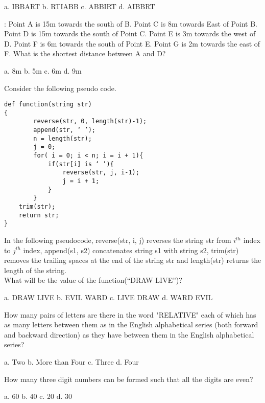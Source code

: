 \documentclass[a4paper, addpoints]{exam}
\begin{document}
\begin{questions}
	\begin{oneparcheckboxes}
		\choice a. IBBART
		\choice b. RTIABB
		\choice c. ABBIRT
		\choice d. AIBBRT
	\end{oneparcheckboxes}
	: Point A is 15m towards the south of B. Point C is 8m towards East of Point B. Point D is 15m towards the south of Point C. Point E is 3m towards the west of D. Point F is 6m towards the south of Point E. Point G is 2m towards the east of F. What is the shortest distance between A and D?\\
	
	\begin{oneparcheckboxes}
		\choice a. 8m
		\choice b. 5m
		\choice c. 6m
		\choice d. 9m
	\end{oneparcheckboxes}
	\question Consider the following pseudo code.
	\begin{verbatim}
def function(string str)
{
		reverse(str, 0, length(str)-1);
		append(str, ‘ ’);
		n = length(str);
		j = 0;
		for( i = 0; i < n; i = i + 1){
			if(str[i] is ‘ ’){
				reverse(str, j, i-1);
				j = i + 1;
			}
		}
	trim(str);
	return str;
}
\end{verbatim}
In the following pseudocode, reverse(str, i, j) reverses the string str from $i^{th}$ index to $j^{th}$ index, append(s1, s2) concatenates string s1 with string s2, trim(str) removes the trailing spaces at the end of the string str and length(str) returns the length of the string.\\
What will be the value of the function(“DRAW LIVE”)?\\

	\begin{oneparcheckboxes}
		\choice a. DRAW LIVE
		\choice b. EVIL WARD
		\choice c. LIVE DRAW
		\choice d. WARD EVIL
	\end{oneparcheckboxes}
	\question How many pairs of letters are there in the word "RELATIVE" each of which has as many letters between them as in the English alphabetical series (both forward and backward direction) as they have between them in the English alphabetical series?\\

	\begin{oneparcheckboxes}
		\choice a. Two
		\choice b. More than Four
		\choice c. Three
		\choice d. Four
	\end{oneparcheckboxes}
	
	\question How many three digit numbers can be formed such that all the digits are even?
	
	\begin{oneparcheckboxes}
		\choice a. 60
		\choice b. 40
		\choice c. 20
		\choice d. 30
	\end{oneparcheckboxes}
	

\end{questions}
\end{document}
